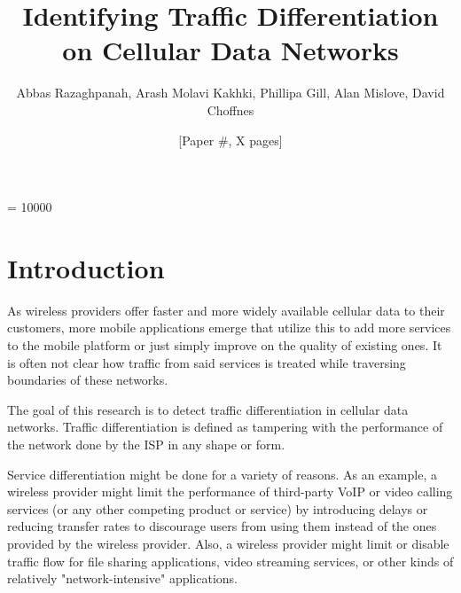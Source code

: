 \documentclass[letterpaper]{sig-alternate-10pt}
\title{Identifying Traffic Differentiation on Cellular Data Networks}
\author{Abbas Razaghpanah, Arash Molavi Kakhki, Phillipa Gill, Alan Mislove, David Choffnes}
\author{[Paper \#, X pages]}
\begin{document}

\widowpenalty = 10000

\maketitle

\section{Introduction}

As wireless providers offer faster and more widely available cellular data to their customers, more mobile applications emerge that utilize this to add more services to the mobile platform or just simply improve on the quality of existing ones. It is often not clear how traffic from said services is treated while traversing boundaries of these networks.

The goal of this research is to detect traffic differentiation in cellular data networks. Traffic differentiation is defined as tampering with the performance of the network done by the ISP in any shape or form.

Service differentiation might be done for a variety of reasons. As an example, a wireless provider might limit the performance of third-party VoIP or video calling services (or any other competing product or service) by introducing delays or reducing transfer rates to discourage users from using them instead of the ones provided by the wireless provider. Also, a wireless provider might limit or disable traffic flow for file sharing applications, video streaming services, or other kinds of relatively "network-intensive" applications.
\end{document}
